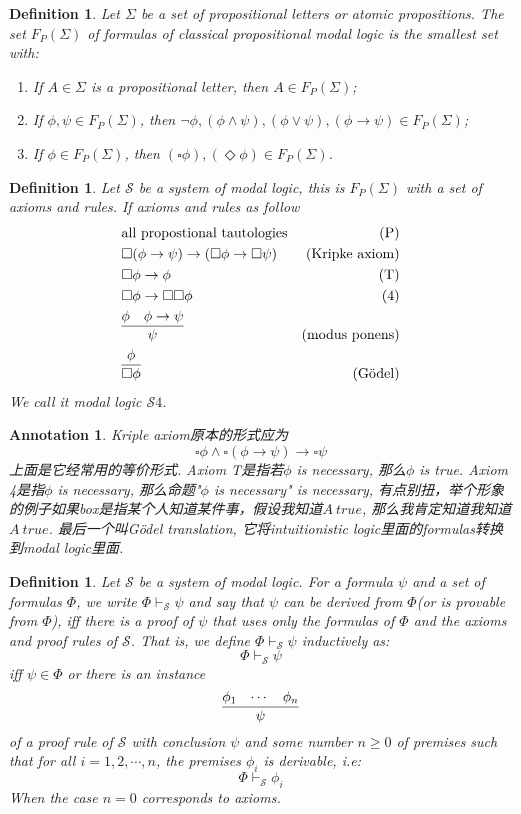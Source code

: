 \documentclass{article}
\theoremstyle{plain}
\newtheorem{definition}[theorem]{Definition}
\newtheorem{annotation}[theorem]{Annotation}
\newcounter{case}
\theoremstyle{nonumberplain}
\begin{document}
\begin{definition}
\rm \cite{15-816-cml}Let $\Sigma$ be a set of propositional letters or atomic propositions. The set $F_P(\Sigma)$ of formulas of classical propositional modal logic is the smallest set with:
\begin{enumerate}
	\item If $A \in \Sigma$ is a propositional letter, then $A \in F_P(\Sigma)$;
	\item If $\phi,\psi \in F_P(\Sigma)$, then $\neg \phi, (\phi \wedge \psi), (\phi \vee \psi), (\phi \to \psi) \in F_P(\Sigma)$;
	\item If $\phi \in F_P(\Sigma)$, then $(\square \phi),(\Diamond \phi) \in F_P(\Sigma)$. 
\end{enumerate}
\end{definition}

\begin{definition}
\rm Let $\mathcal{S}$ be a system of modal logic, this is $F_P(\Sigma)$ with a set of axioms and rules. If axioms and rules as follow
$$
\begin{aligned}
&\text{all propostional tautologies}&(\text{P}) \\
&\square(\phi \to \psi) \to (\square\phi \to \square\psi)& (\text{Kripke axiom})\\
&\square\phi \to \phi & (\text{T}) \\
&\square\phi \to \square\square\phi &(4) \\
&\infer{\psi}{\phi & \phi \to \psi} & (\text{modus ponens})\\
&\infer{\square \phi}{\phi} & (\text{G\"{o}del}) 
\end{aligned}
$$
We call it modal logic $\mathcal{S}4$.
\end{definition}


\begin{annotation}
\rm Kriple axiom原本的形式应为
$$
\square \phi \wedge \square(\phi \to \psi) \to \square \psi
$$
上面是它经常用的等价形式. Axiom T是指若$\phi$ is necessary, 那么$\phi$ is true. Axiom 4是指$\phi$ is necessary, 那么命题"$\phi$ is necessary" is necessary, 有点别扭，举个形象的例子如果box是指某个人知道某件事，假设我知道$A~true$, 那么我肯定知道我知道$A~true$. 最后一个叫G\"{o}del translation, 它将intuitionistic logic里面的formulas转换到modal logic里面. 
\end{annotation}

\begin{definition}
\rm Let $\mathcal{S}$ be a system of modal logic. For a formula $\psi$ and a set of formulas $\Phi$,  we write $\Phi \vdash_\mathcal{S} \psi$ and say that $\psi$ can be derived from $\Phi$(or is provable from $\Phi$), iff there is a proof of $\psi$ that uses only the formulas of $\Phi$ and the axioms and proof rules of $\mathcal{S}$. That is, we define $\Phi \vdash_\mathcal{S} \psi$ inductively as:
$$
\Phi \vdash_\mathcal{S} \psi
$$
iff $\psi \in \Phi$ or there is an instance
$$
\infer{\psi}{\phi_1 &  \cdots & \phi_n}
$$
of a proof rule of $\mathcal{S}$ with conclusion $\psi$ and some number $n \geq 0$ of premises such that for all $i=1,2,\cdots,n$, the premises $\phi_i$ is derivable, i.e:
$$
\Phi \vdash_\mathcal{S} \phi_i
$$
When the case $n=0$ corresponds to axioms. 
\end{definition}
\end{document}
